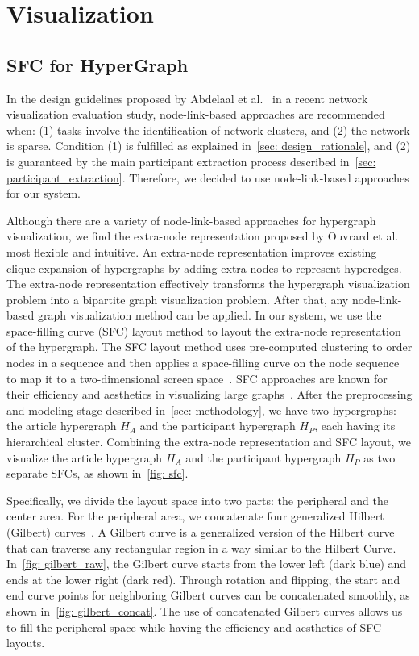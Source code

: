 \section{Visualization}
\subsection{SFC for HyperGraph}

In the design guidelines proposed by Abdelaal et al.~\cite{abdelaal2022network} in a recent network visualization evaluation study, node-link-based approaches are recommended when:
(1) tasks involve the identification of network clusters, and (2) the network is sparse.
Condition (1) is fulfilled as explained in~\autoref{sec: design_rationale}, and (2) is guaranteed by the main participant extraction process described in~\autoref{sec: participant_extraction}. 
Therefore, we decided to use node-link-based approaches for our system.

Although there are a variety of node-link-based approaches for hypergraph visualization, we find the extra-node representation proposed by Ouvrard et al.~\cite{ouvrard2017hypergraph} most flexible and intuitive.
An extra-node representation improves existing clique-expansion of hypergraphs by adding extra nodes to represent hyperedges. 
The extra-node representation effectively transforms the hypergraph visualization problem into a bipartite graph visualization problem.
After that, any node-link-based graph visualization method can be applied.
In our system, we use the space-filling curve (SFC) layout method to layout the extra-node representation of the hypergraph.
The SFC layout method uses pre-computed clustering to order nodes in a sequence and then applies a space-filling curve on the node sequence to map it to a two-dimensional screen space~\cite{muelder2008sfc}.
SFC approaches are known for their efficiency and aesthetics in visualizing large graphs~\cite{ma2013largegraph}.
After the preprocessing and modeling stage described in~\autoref{sec: methodology}, we have two hypergraphs: the article hypergraph $H_A$ and the participant hypergraph $H_P$, each having its hierarchical cluster.
Combining the extra-node representation and SFC layout, we visualize the article hypergraph $H_A$ and the participant hypergraph $H_P$ as two separate SFCs, as shown in~\autoref{fig: sfc}.

Specifically, we divide the layout space into two parts: the peripheral and the center area.
For the peripheral area, we concatenate four generalized Hilbert (Gilbert) curves~\cite{gilbert}.
A Gilbert curve is a generalized version of the Hilbert curve that can traverse any rectangular region in a way similar to the Hilbert Curve.
In~\autoref{fig: gilbert_raw}, the Gilbert curve starts from the lower left (dark blue) and ends at the lower right (dark red).
Through rotation and flipping, the start and end curve points for neighboring Gilbert curves can be concatenated smoothly, as shown in~\autoref{fig: gilbert_concat}.
The use of concatenated Gilbert curves allows us to fill the peripheral space while having the efficiency and aesthetics of SFC layouts.


